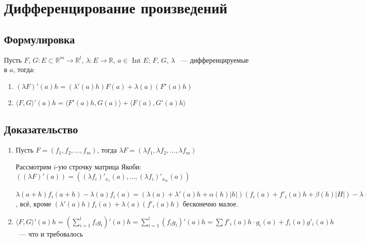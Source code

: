 \documentclass{article}
\begin{document}
    \section{Дифференцирование произведений}
    
        \subsection{Формулировка}
        
            Пусть $F$, $G : E \subset \mathbb{R}^m \rightarrow \mathbb{R}^l$, $\lambda : E \rightarrow \mathbb{R}$, $a \in$ Int $E$; $F$, $G$, $\lambda$ ~--- дифференцируемые в $a$, тогда:
            
            \begin{enumerate}
            
                \item $\left( \lambda F \right)'(a)h = (\lambda'(a)h)F(a) + \lambda(a)\left(F'(a)h\right)$
                
                \item $\langle F, G \rangle'(a)h = \langle F'(a)h, G(a)\rangle + \langle F(a), G'(a)h \rangle$
                
            \end{enumerate}
            
        \subsection{Доказательство}
        
            \begin{enumerate}
            
                \item Пусть $F = (f_1, f_2, \ldots, f_m)$, тогда $\lambda F = (\lambda f_1, \lambda f_2, \ldots, \lambda f_m)$
                
                    Рассмотрим $i$-ую строчку матрица Якоби: $((\lambda F)'(a)) = ((\lambda f_i)'_{x_1} (a), \ldots, (\lambda f_i)'_{x_m} (a))$
                    
                    $\lambda (a + h) f_i (a + h) - \lambda (a) f_i(a) = (\lambda (a) + \lambda'(a) h + \alpha(h) |h|)(f_i(a) + f'_i(a)h + \beta(h) |H|) - \lambda(a) f_i(a) = (\lambda'(a) h)f_i(a) + \lambda(a)(f'_i(a)h) + (\lambda'(a)h)(f'_i(a)h) + \alpha(h) |h| f_i(a) + \ldots$, всё, кроме $(\lambda'(a) h)f_i(a) + \lambda(a)(f'_i(a)h)$ бесконечно малое.
                    
                \item $\langle F, G \rangle'(a)h = \left(\sum\limits_{i = 1}^l f_i g_i \right)'(a)h = \sum\limits^l_{i = 1} (f_i g_i)'(a) h = \sum f'_i(a) h \cdot g_i(a) + f_i(a) g'_i(a)h$ ~--- что и требовалось
                
            \end{enumerate}
            
\end{document}
